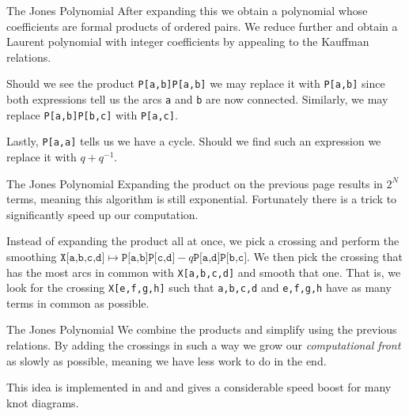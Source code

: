 \documentclass{beamer}
\begin{document}
    \begin{frame}{The Jones Polynomial}
        After expanding this we obtain a polynomial whose coefficients are
        formal products of ordered pairs. We reduce further and obtain a
        Laurent polynomial with integer coefficients by appealing to the
        Kauffman relations.
        \par\hfill\par
        Should we see the product
        \texttt{P[a,b]P[a,b]} we may replace it with \texttt{P[a,b]} since
        both expressions tell us the arcs \texttt{a} and \texttt{b} are now
        connected. Similarly, we may replace \texttt{P[a,b]P[b,c]} with
        \texttt{P[a,c]}.
        \par\hfill\par
        Lastly, \texttt{P[a,a]} tells us we have a cycle. Should we find
        such an expression we replace it with $q+q^{-1}$.
    \end{frame}
    \begin{frame}{The Jones Polynomial}
        Expanding the product on the previous page results in $2^{N}$
        terms, meaning this algorithm is still exponential. Fortunately there
        is a trick to significantly speed up our computation.
        \par\hfill\par
        Instead of expanding the product all at once, we pick a crossing and
        perform the smoothing
        $\texttt{X[a,b,c,d]}\mapsto\texttt{P[a,b]P[c,d]}-q\texttt{P[a,d]P[b,c]}$.
        We then pick the crossing that has the most arcs in common with
        \texttt{X[a,b,c,d]} and smooth that one. That is, we look for the
        crossing \texttt{X[e,f,g,h]} such that
        \texttt{a,b,c,d} and \texttt{e,f,g,h} have as many terms in common as
        possible.
    \end{frame}
    \begin{frame}{The Jones Polynomial}
        We combine the products and simplify using the previous relations.
        By adding the crossings in such a way we grow our
        \textit{computational front} as slowly as possible, meaning we have
        less work to do in the end.
        \par\hfill\par
        This idea is implemented in \cite{KatlasJones} and
        \cite{MaguireJones} and gives a considerable speed boost for many
        knot diagrams.
    \end{frame}
\end{document}
